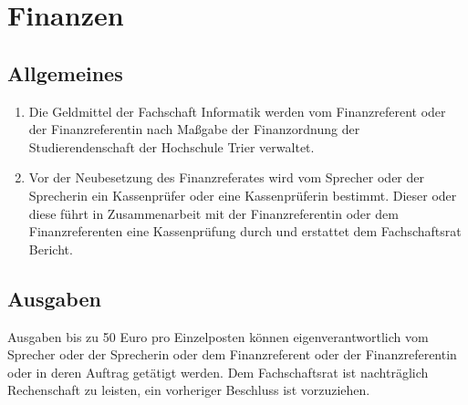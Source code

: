 \section{Finanzen}
\subsection{Allgemeines}
\begin{enumerate}
\item Die Geldmittel der Fachschaft Informatik werden vom Finanzreferent oder der Finanzreferentin nach Maßgabe der Finanzordnung der Studierendenschaft der Hochschule Trier verwaltet.
\item Vor der Neubesetzung des Finanzreferates wird vom Sprecher oder der Sprecherin ein Kassenprüfer oder eine Kassenprüferin bestimmt. Dieser oder diese führt in Zusammenarbeit mit der Finanzreferentin oder dem Finanzreferenten eine Kassenprüfung durch und erstattet dem Fachschaftsrat Bericht.
\end{enumerate}

\subsection{Ausgaben}
Ausgaben bis zu 50 Euro pro Einzelposten können eigenverantwortlich vom Sprecher oder der Sprecherin oder dem Finanzreferent oder der Finanzreferentin oder in deren Auftrag getätigt werden. Dem Fachschaftsrat ist nachträglich Rechenschaft zu leisten, ein vorheriger Beschluss ist vorzuziehen.
